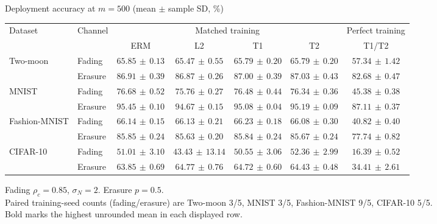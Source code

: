 \documentclass[border=4pt]{standalone}
\begin{document}
\begin{minipage}{7.8in}
\centering
Deployment accuracy at $m=500$ (mean $\pm$ sample SD, \%)\\[4pt]
\begin{tabular*}{\linewidth}{@{\extracolsep{\fill}}llccccc@{}}
\toprule
\multirow{2}{*}{Dataset} & \multirow{2}{*}{Channel} & \multicolumn{4}{c}{Matched training} & Perfect training \\
\cmidrule(lr){3-6}\cmidrule(l){7-7}
 & & ERM & L2 & T1 & T2 & T1/T2 \\
\midrule
\multirow{2}{*}{Two-moon} & Fading & $\mathbf{65.85}\,\pm\,0.13$ & $65.47\,\pm\,0.55$ & $65.79\,\pm\,0.20$ & $65.79\,\pm\,0.20$ & $57.34\,\pm\,1.42$ \\
 & Erasure & $86.91\,\pm\,0.39$ & $86.87\,\pm\,0.26$ & $87.00\,\pm\,0.39$ & $\mathbf{87.03}\,\pm\,0.43$ & $82.68\,\pm\,0.47$ \\
\midrule[0.25pt]
\multirow{2}{*}{MNIST} & Fading & $\mathbf{76.68}\,\pm\,0.52$ & $75.76\,\pm\,0.27$ & $76.48\,\pm\,0.44$ & $76.34\,\pm\,0.36$ & $45.38\,\pm\,0.38$ \\
 & Erasure & $\mathbf{95.45}\,\pm\,0.10$ & $94.67\,\pm\,0.15$ & $95.08\,\pm\,0.04$ & $95.19\,\pm\,0.09$ & $87.11\,\pm\,0.37$ \\
\midrule[0.25pt]
\multirow{2}{*}{Fashion-MNIST} & Fading & $66.14\,\pm\,0.15$ & $66.13\,\pm\,0.21$ & $\mathbf{66.23}\,\pm\,0.18$ & $66.08\,\pm\,0.30$ & $40.82\,\pm\,0.40$ \\
 & Erasure & $\mathbf{85.85}\,\pm\,0.24$ & $85.63\,\pm\,0.20$ & $85.84\,\pm\,0.24$ & $85.67\,\pm\,0.24$ & $77.74\,\pm\,0.82$ \\
\midrule[0.25pt]
\multirow{2}{*}{CIFAR-10} & Fading & $51.01\,\pm\,3.10$ & $43.43\,\pm\,13.14$ & $50.55\,\pm\,3.06$ & $\mathbf{52.36}\,\pm\,2.99$ & $16.39\,\pm\,0.52$ \\
 & Erasure & $63.85\,\pm\,0.69$ & $\mathbf{64.77}\,\pm\,0.76$ & $64.72\,\pm\,0.60$ & $64.43\,\pm\,0.48$ & $34.41\,\pm\,2.61$ \\
\bottomrule
\end{tabular*}
\par\smallskip\raggedright\footnotesize
Fading $\rho_c=0.85$, $\sigma_N=2$. Erasure $p=0.5$.\\
Paired training-seed counts (fading/erasure) are Two-moon 3/5, MNIST 3/5, Fashion-MNIST 9/5, CIFAR-10 5/5.\\
Bold marks the highest unrounded mean in each displayed row.
\end{minipage}
\end{document}
